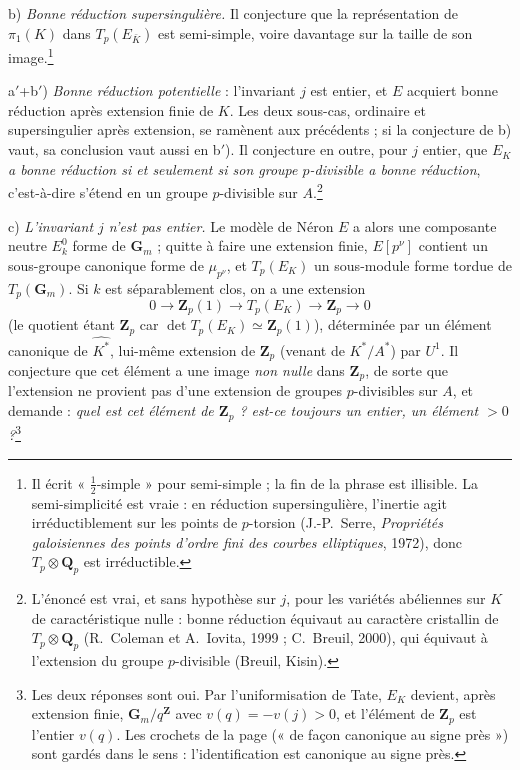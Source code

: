 \documentclass[11pt,a4paper]{article}
\begin{document}
b) \emph{Bonne réduction supersingulière.} Il conjecture que la représentation
de $\pi_1(K)$ dans $T_p(E_{\bar K})$ est semi-simple, voire davantage sur la
taille de son image.\footnote{Il écrit « $\tfrac12$-simple » pour semi-simple ;
la fin de la phrase est illisible. La semi-simplicité est vraie : en réduction
supersingulière, l'inertie agit irréductiblement sur les points de
$p$-torsion (J.-P.~Serre, \emph{Propriétés galoisiennes des points d'ordre fini
des courbes elliptiques}, 1972), donc $T_p \otimes \mathbf{Q}_p$ est
irréductible.}

a$'$+b$'$) \emph{Bonne réduction potentielle} : l'invariant $j$ est entier, et
$E$ acquiert bonne réduction après extension finie de $K$. Les deux sous-cas,
ordinaire et supersingulier après extension, se ramènent aux précédents ; si la
conjecture de b) vaut, sa conclusion vaut aussi en b$'$). Il conjecture en
outre, pour $j$ entier, que \emph{$E_K$ a bonne réduction si et seulement si
son groupe $p$-divisible a bonne réduction}, c'est-à-dire s'étend en un groupe
$p$-divisible sur $A$.\footnote{L'énoncé est vrai, et sans hypothèse sur $j$,
pour les variétés abéliennes sur $K$ de caractéristique nulle : bonne réduction
équivaut au caractère cristallin de $T_p \otimes \mathbf{Q}_p$ (R.~Coleman et
A.~Iovita, 1999 ; C.~Breuil, 2000), qui équivaut à l'extension du groupe
$p$-divisible (Breuil, Kisin).}

c) \emph{L'invariant $j$ n'est pas entier.} Le modèle de Néron $E$ a alors
une composante neutre $E^0_k$ forme de $\mathbf{G}_m$ ; quitte à faire une
extension finie, $E[p^\nu]$ contient un sous-groupe canonique forme de
$\mu_{p^\nu}$, et $T_p(E_K)$ un sous-module forme tordue de
$T_p(\mathbf{G}_m)$. Si $k$ est séparablement clos, on a une extension
\[
  0 \longrightarrow \mathbf{Z}_p(1) \longrightarrow T_p(E_K) \longrightarrow
  \mathbf{Z}_p \longrightarrow 0
\]
(le quotient étant $\mathbf{Z}_p$ car $\det T_p(E_K) \simeq \mathbf{Z}_p(1)$),
déterminée par un élément canonique de $\widehat{K^*}$, lui-même extension de
$\mathbf{Z}_p$ (venant de $K^*/A^*$) par $U^1$. Il conjecture que cet élément
a une image \emph{non nulle} dans $\mathbf{Z}_p$, de sorte que l'extension ne
provient pas d'une extension de groupes $p$-divisibles sur $A$, et demande :
\emph{quel est cet élément de $\mathbf{Z}_p$ ? est-ce toujours un entier, un
élément $> 0$ ?}\footnote{Les deux réponses sont oui. Par l'uniformisation de
Tate, $E_K$ devient, après extension finie, $\mathbf{G}_m/q^{\mathbf{Z}}$ avec
$v(q) = -v(j) > 0$, et l'élément de $\mathbf{Z}_p$ est l'entier $v(q)$. Les
crochets de la page (« de façon canonique au signe près ») sont gardés dans le
sens : l'identification est canonique au signe près.}
\end{document}
